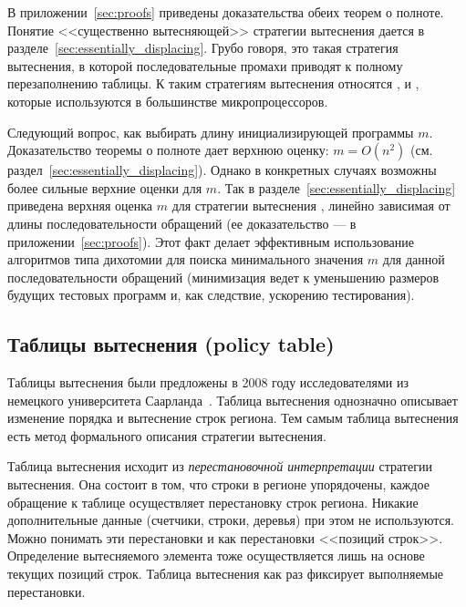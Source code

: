 \begin{enumerate}
\begin{theorem}\label{mirror_fullness}
\FullnessMirror
\end{theorem}

В приложении~\ref{sec:proofs} приведены доказательства обеих теорем о полноте. Понятие <<существенно вытесняющей>> стратегии вытеснения дается в разделе~\ref{sec:essentially_displacing}. Грубо говоря, это такая стратегия вытеснения, в которой последовательные промахи приводят к полному перезаполнению таблицы. К таким стратегиям вытеснения относятся \LRU, \FIFO и \PseudoLRU, которые используются в большинстве микропроцессоров.

Следующий вопрос, как выбирать длину инициализирующей программы $m$. %
Доказательство теоремы о полноте дает верхнюю оценку: $m = O(n^2)$ (см. раздел~\ref{sec:essentially_displacing}). Однако в конкретных случаях возможны более сильные верхние оценки для $m$. Так в разделе~\ref{sec:essentially_displacing} приведена верхняя оценка $m$ для стратегии вытеснения \LRU, линейно зависимая от длины последовательности обращений (ее доказательство --- в приложении~\ref{sec:proofs}). Этот факт делает эффективным использование алгоритмов типа дихотомии для поиска минимального значения $m$ для данной последовательности обращений (минимизация ведет к уменьшению размеров будущих тестовых программ и, как следствие, ускорению тестирования).

\subsection{Таблицы вытеснения (policy table)}\label{sec:policy_table}

Таблицы вытеснения были предложены в 2008 году исследователями из немецкого университета Саарланда~\cite{policy_tables}. Таблица вытеснения однозначно описывает изменение порядка и вытеснение строк региона. Тем самым таблица вытеснения есть метод формального описания стратегии вытеснения.

Таблица вытеснения исходит из \emph{перестановочной интерпретации} стратегии
вытеснения. Она состоит в том, что строки в регионе упорядочены, каждое
обращение к таблице осуществляет перестановку строк региона.
Никакие дополнительные данные (счетчики, строки, деревья) при этом не используются. Можно понимать эти перестановки и как перестановки <<позиций строк>>.
Определение вытесняемого элемента тоже осуществляется лишь на основе текущих
позиций строк. Таблица вытеснения как раз фиксирует выполняемые перестановки.


\end{enumerate}

